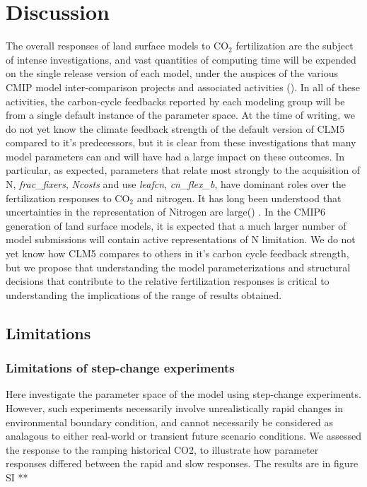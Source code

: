\documentclass[draft,linenumbers]{agujournal}
\begin{document}
\section{Discussion}
The overall responses of land surface models to CO$_{2}$ fertilization are the subject of intense investigations, and vast quantities of computing time will be expended on the single release version of each model, under the auspices of the various CMIP model inter-comparison projects and associated activities  (\cite{meehl2014}).  In all of these activities, the carbon-cycle feedbacks reported by each modeling group will be from a single default instance of the parameter space.  At the time of writing, we do not yet know the climate feedback strength of the default version of CLM5 compared to it's predecessors, but it is clear from these investigations that many model parameters can and will have had a large impact on these outcomes.  In particular, as expected, parameters that relate most strongly to the acquisition of N, \emph{frac\_fixers}, \emph{Ncosts} and use \emph{leafcn}, \emph{cn\_flex\_b}, have dominant roles over the fertilization responses to CO$_{2}$ and nitrogen.  It has long been understood that uncertainties in the representation of Nitrogen are large(\cite{zaehle2014}) . In the CMIP6 generation of land surface models, it is expected that a much larger number of model submissions will contain active representations of N limitation. We do not yet know how CLM5 compares to others in it's carbon cycle feedback strength, but we propose that understanding the model parameterizations and structural decisions that contribute to the relative fertilization responses is critical to understanding the implications of the range of results obtained. 

\subsection{Limitations}
\subsubsection{Limitations of step-change experiments}
Here investigate the parameter space of the model using step-change experiments. However, such experiments necessarily involve unrealistically rapid changes in environmental boundary condition, and cannot necessarily be considered as analagous to either real-world or transient future scenario conditions. We assessed the response to the ramping historical CO2, to illustrate how parameter responses differed between the rapid and slow responses. The results are in figure SI **
\end{document}
